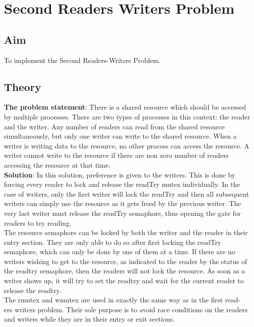 \section{Second Readers Writers Problem}
\subsection{Aim}
To implement the Second Readers-Writers Problem.

\subsection{Theory}
\textbf{The problem statement}: There is a shared resource which should be accessed by
multiple processes. There are two types of processes in this context: the reader and
the writer. Any number of readers can read from the shared resource simultaneously,
but only one writer can write to the shared resource. When a writer is writing data
to the resource, no other process can access the resource. A writer cannot write to
the resource if there are non zero number of readers accessing the resource at that
time. \\
\textbf{Solution}: In this solution, preference is given to the writers. This is done by
forcing every reader to lock and release the readTry mutex individually. In the case
of writers, only the first writer will lock the readTry and then all subsequent writers
can simply use the resource as it gets freed by the previous writer. The very last
writer must release the readTry semaphore, thus opening the gate for readers to try
reading.\\
The resource semaphore can be locked by both the writer and the reader in their
entry section. They are only able to do so after first locking the readTry semaphore,
which can only be done by one of them at a time.
If there are no writers wishing to get to the resource, as indicated to the reader
by the status of the readtry semaphore, then the readers will not lock the resource.
As soon as a writer shows up, it will try to set the readtry and wait for the current
reader to release the readtry.
\\
The rmutex and wmutex are used in exactly the same way as in the first read-
ers writers problem. Their sole purpose is to avoid race conditions on the readers
and writers while they are in their entry or exit sections.

